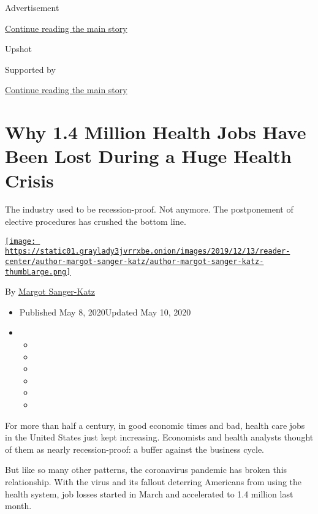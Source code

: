 Advertisement

\protect\hyperlink{after-top}{Continue reading the main story}

Upshot

Supported by

\protect\hyperlink{after-sponsor}{Continue reading the main story}

\hypertarget{why-14-million-health-jobs-have-been-lost-during-a-huge-health-crisis}{%
\section{Why 1.4 Million Health Jobs Have Been Lost During a Huge Health
Crisis}\label{why-14-million-health-jobs-have-been-lost-during-a-huge-health-crisis}}

The industry used to be recession-proof. Not anymore. The postponement
of elective procedures has crushed the bottom line.

\href{https://www.nytimes3xbfgragh.onion/by/margot-sanger-katz}{\texttt{[image: https://static01.graylady3jvrrxbe.onion/images/2019/12/13/reader-center/author-margot-sanger-katz/author-margot-sanger-katz-thumbLarge.png]}}

By
\href{https://www.nytimes3xbfgragh.onion/by/margot-sanger-katz}{Margot
Sanger-Katz}

\begin{itemize}
\item
  Published May 8, 2020Updated May 10, 2020
\item
  \begin{itemize}
  \item
  \item
  \item
  \item
  \item
  \item
  \end{itemize}
\end{itemize}

For more than half a century, in good economic times and bad, health
care jobs in the United States just kept increasing. Economists and
health analysts thought of them as nearly recession-proof: a buffer
against the business cycle.

But like so many other patterns, the coronavirus pandemic has broken
this relationship. With the virus and its fallout deterring Americans
from using the health system, job losses started in March and
accelerated to 1.4 million last month.

